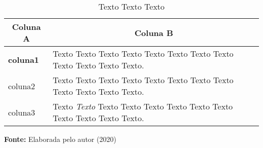 

\begin{table}[ht]
\caption{Texto Texto Texto}
\label{tbl:tabelaex}
\centering
{}
\begin{tabular}{p{6cm}p{9cm}}
\hline
\multicolumn{1}{c}{\textbf{Coluna A}} & \multicolumn{1}{c}{\textbf{Coluna B}}  \\
\hline     
\textbf{coluna1} & Texto Texto Texto Texto Texto Texto Texto Texto Texto Texto Texto Texto.
\\ 

coluna2 & Texto Texto Texto Texto Texto Texto Texto Texto Texto Texto Texto Texto.              
\\ 

coluna3 & Texto \textit{Texto} Texto Texto Texto Texto Texto Texto Texto Texto Texto Texto.     
\\ \hline

\end{tabular}

  \par\medskip\ABNTEXfontereduzida\selectfont\textbf{Fonte:} Elaborada pelo autor (2020) \par\medskip
\end{table}
